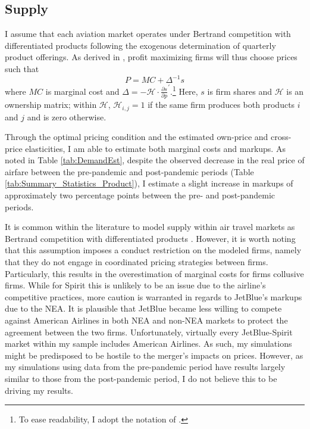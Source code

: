 \documentclass{article}
\begin{document}
	\subsection{Supply}
	\label{sec:Analysis_Supply}
	I assume that each aviation market operates under Bertrand competition with differentiated products following the exogenous determination of quarterly product offerings. As derived in \citet{berry_automobile_1995}, profit maximizing firms will thus choose prices such that \[P = MC + \Delta^{-1} s\] where $MC$ is marginal cost and $\Delta = - \mathcal{H} \cdot \frac{\partial s}{\partial p}^{'}$.\footnote{To ease readability, I adopt the notation of \citet{conlon_best_2020}.} Here, $s$ is firm shares and $\mathcal{H}$ is an ownership matrix; within $\mathcal{H}$, $\mathcal{H}_{i,j} = 1$ if the same firm produces both products $i$ and $j$ and is zero otherwise.

    Through the optimal pricing condition and the estimated own-price and cross-price elasticities, I am able to estimate both marginal costs and markups. As noted in Table \ref{tab:DemandEst}, despite the observed decrease in the real price of airfare between the pre-pandemic and post-pandemic periods (Table \ref{tab:Summary_Statistics_Product}), I estimate a slight increase in markups of approximately two percentage points between the pre- and post-pandemic periods.  

    It is common within the literature to model supply within air travel markets as Bertrand competition with differentiated products \citep{ciliberto_market_2021, li_repositioning_2022}. However, it is worth noting that this assumption imposes a conduct restriction on the modeled firms, namely that they do not engage in coordinated pricing strategies between firms. Particularly, this results in the overestimation of marginal costs for firms collusive firms. While for Spirit this is unlikely to be an issue due to the airline's competitive practices, more caution is warranted in regards to JetBlue's markups due to the NEA. It is plausible that JetBlue became less willing to compete against American Airlines in both NEA and non-NEA markets to protect the agreement between the two firms. Unfortunately, virtually every JetBlue-Spirit market within my sample includes American Airlines. As such, my simulations might be predisposed to be hostile to the merger's impacts on prices. However, as my simulations using data from the pre-pandemic period have results largely similar to those from the post-pandemic period, I do not believe this to be driving my results. 
	
\end{document}
